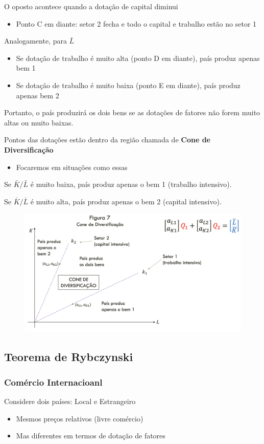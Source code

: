 \documentclass[a4paper,12pt]{article}[abntex2]
\begin{document}
O oposto acontece quando a dotação de capital diminui
\begin{itemize}
    \item Ponto C em diante: setor 2 fecha e todo o capital e trabalho estão no setor 1
\end{itemize}

Analogamente, para $\bar{L}$
\begin{itemize}
    \item Se dotação de trabalho é muito alta (ponto D em diante), país produz apenas bem 1
    \item Se dotação de trabalho é muito baixa (ponto E em diante), país produz apenas bem 2
\end{itemize}

Portanto, o país produzirá os dois bens se as dotações de fatores não forem muito altas ou muito baixas.

Pontos das dotações estão dentro da região chamada de \textbf{Cone de Diversificação}
\begin{itemize}
    \item Focaremos em situações como essas
\end{itemize}

Se $\bar{K}/\bar{L}$ é muito baixa, país produz apenas o bem 1 (trabalho intensivo).

Se $\bar{K}/\bar{L}$ é muito alta, país produz apenas o bem 2 (capital intensivo).

\begin{figure}[H]
    \centering
    \includegraphics[width=0.7\linewidth]{Imagens/a11i7.png}
\end{figure}

\subsection{\textbf{Teorema de Rybczynski}}
\subsubsection{\textbf{Comércio Internacioanl}}
Considere dois países: Local e Estrangeiro
\begin{itemize}
    \item Mesmos preços relativos (livre comércio)
    \item Mas diferentes em termos de dotação de fatores
\end{itemize}
\end{document}
